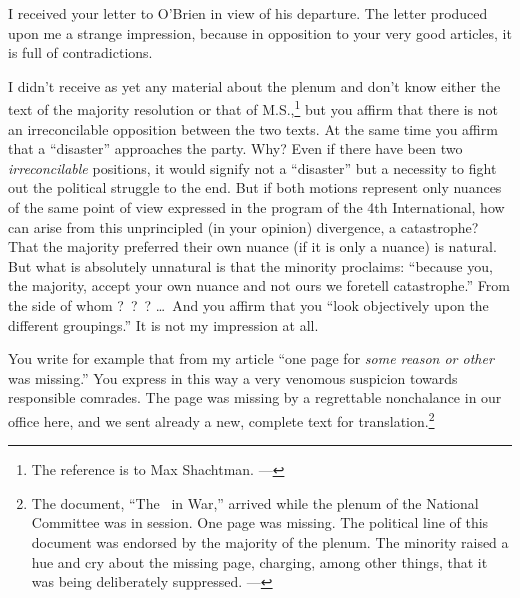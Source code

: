 

I received your letter to O’Brien in view of his departure. The letter produced upon me a strange impression, because in opposition to your very good articles, it is full of contradictions.

I didn’t receive as yet any material about the plenum and don’t know either the text of the majority resolution or that of M.S.,\footnote{The reference is to Max Shachtman. ---\ed} but you affirm that there is not an irreconcilable opposition between the two texts. At the same time you affirm that a “disaster” approaches the party. Why? Even if there have been two \emph{irreconcilable} positions, it would signify not a “disaster” but a necessity to fight out the political struggle to the end. But if both motions represent only nuances of the same point of view expressed in the program of the 4th International, how can arise from this unprincipled (in your opinion) divergence, a catastrophe? That the majority preferred their own nuance (if it is only a nuance) is natural. But what is absolutely unnatural is that the minority proclaims: “because you, the majority, accept your own nuance and not ours we foretell catastrophe.” From the side of whom ?~?~? \dots\ And you affirm that you “look objectively upon the different groupings.” It is not my impression at all.

You write for example that from my article “one page for \emph{some reason or other} was missing.” You express in this way a very venomous suspicion towards responsible comrades. The page was missing by a regrettable nonchalance in our office here, and we sent already a new, complete text for translation.\footnote{The document, ``The \USSR\ in War,'' arrived while the plenum of the National Committee was in session. One page was missing. The political line of this document was endorsed by the majority of the plenum. The minority raised a hue and cry about the missing page, charging, among other things, that it was being deliberately suppressed. ---\ed}

